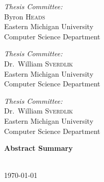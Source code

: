 \begin{titlepage}
\begin{center}
        \begin{minipage}{0.32\textwidth}
            \begin{flushleft} \large
                \emph{Thesis Committee:}\\
                Byron \textsc{Heads} \\
                \small Eastern Michigan University\\
                \small Computer Science Department \\
            \end{flushleft}
        \end{minipage}
        \begin{minipage}{0.32\textwidth}
            \begin{center} \large
                \emph{Thesis Committee:} \\
                Dr.~William \textsc{Sverdlik}\\
                \small Eastern Michigan University\\
                \small Computer Science Department
            \end{center}
        \end{minipage}
        \begin{minipage}{0.32\textwidth}
            \begin{flushright} \large
                \emph{Thesis Committee:} \\
                Dr.~William \textsc{Sverdlik}\\
                \small Eastern Michigan University\\
                \small Computer Science Department
            \end{flushright}
        \end{minipage}

        \vfill
        { \large \textbf{Abstract Summary}}\\		

		\begin{center}
		\end{center}
	
    
        \HRule\\[0.5cm]
        { \large \today }
    \end{center}
\end{titlepage}
